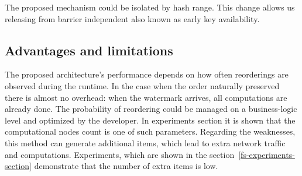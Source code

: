 The proposed mechanism could be isolated by hash range. This change allows us releasing from barrier independent also known as early key availability.

\subsection{Advantages and limitations}

The proposed architecture's performance depends on how often reorderings are observed during the runtime. In the case when the order naturally preserved there is almost no overhead: when the watermark arrives, all computations are already done. The probability of reordering could be managed on a business-logic level and optimized by the developer. In experiments section it is shown that the computational nodes count is one of such parameters. Regarding the weaknesses, this method can generate additional items, which lead to extra network traffic and computations. Experiments, which are shown in the section~\ref{fs-experiments-section} demonstrate that the number of extra items is low.

